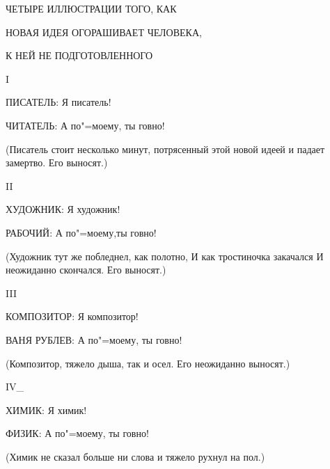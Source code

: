 ЧЕТЫРЕ ИЛЛЮСТРАЦИИ ТОГО, КАК 

    \hspace{0.5cm}
    \parbox{10cm}{НОВАЯ ИДЕЯ ОГОРАШИВАЕТ ЧЕЛОВЕКА,}

    \hspace{1cm}
    \parbox{10cm}{К НЕЙ НЕ ПОДГОТОВЛЕННОГО}

I 

ПИСАТЕЛЬ: Я писатель! 

ЧИТАТЕЛЬ: А по"=моему, ты говно! 

    \hspace{1cm}
    \parbox{10cm}{(Писатель стоит несколько минут,  потрясенный
    этой новой идеей и падает замертво. Его выносят.)}

II

\vspace{0.5cm}

ХУДОЖНИК: Я художник! 

РАБОЧИЙ: А по"=моему,ты говно! 

    \hspace{1cm}
    \parbox{10cm}{(Художник тут же побледнел, как полотно,
    И как тростиночка  закачался 
    И неожиданно скончался.
    Его выносят.)}

\vspace{0.5cm}
    
III 

КОМПОЗИТОР: Я композитор! 

ВАНЯ РУБЛЕВ: А по"=моему, ты говно! 

    \hspace{1cm}
    \parbox[2cm]{10cm}{(Композитор,  тяжело  дыша,  так и осел.
    Его неожиданно выносят.)}

IV\_ 

ХИМИК: Я химик!

ФИЗИК: А по"=моему, ты говно!

    \hspace{1cm}
    \parbox[2cm]{10cm}{(Химик не сказал больше ни слова и 
    тяжело рухнул на пол.)}